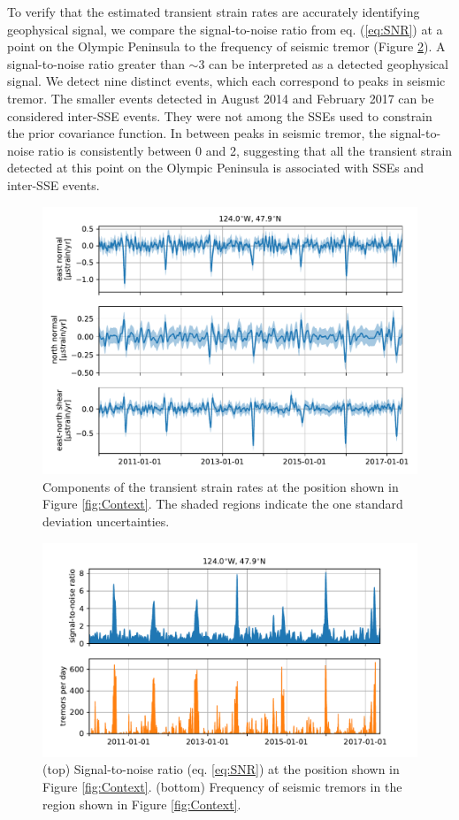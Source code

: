 \documentclass[extra,mreferee]{gji}
\begin{document}

To verify that the estimated transient strain rates are accurately
identifying geophysical signal, we compare the signal-to-noise ratio
from eq. (\ref{eq:SNR}) at a point on the Olympic Peninsula to the
frequency of seismic tremor (Figure \ref{fig:StrainMag}). A
signal-to-noise ratio greater than ${\sim}3$ can be interpreted as a
detected geophysical signal. We detect nine distinct events, which
each correspond to peaks in seismic tremor. The smaller events
detected in August 2014 and February 2017 can be considered inter-SSE
events. They were not among the SSEs used to constrain the prior
covariance function. In between peaks in seismic tremor, the
signal-to-noise ratio is consistently between 0 and 2, suggesting that
all the transient strain detected at this point on the Olympic
Peninsula is associated with SSEs and inter-SSE events.

\begin{figure}
\includegraphics{figures/strain_ts/strain-ts.pdf}
\caption{
Components of the transient strain rates at the position shown in
Figure \ref{fig:Context}. The shaded regions indicate the one standard
deviation uncertainties.
}   
\label{fig:StrainTs}
\end{figure}

\begin{figure}
\includegraphics{figures/strain_ts/mag-ts.pdf}
\caption{
(top) Signal-to-noise ratio (eq. \ref{eq:SNR}) at the position shown
in Figure \ref{fig:Context}. (bottom) Frequency of seismic tremors in
the region shown in Figure \ref{fig:Context}.
}   
\label{fig:StrainMag}
\end{figure}
\end{document}
